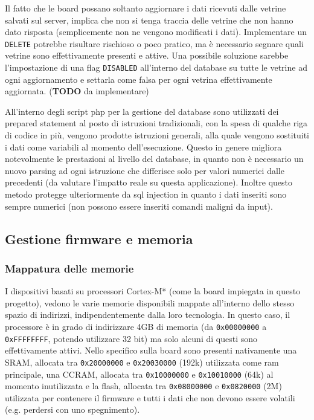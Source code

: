 Il fatto che le board possano soltanto aggiornare i dati ricevuti dalle vetrine salvati sul server, implica che non si tenga traccia delle vetrine che non hanno dato risposta (semplicemente non ne vengono modificati i dati). Implementare un \texttt{DELETE} potrebbe risultare rischioso o poco pratico, ma \`e necessario segnare quali vetrine sono effettivamente presenti e attive. Una possibile soluzione sarebbe l'impostazione di una flag \texttt{DISABLED} all'interno del database su tutte le vetrine ad ogni aggiornamento e settarla come falsa per ogni vetrina effettivamente aggiornata. (\textbf{TODO} da implementare)

All'interno degli script php per la gestione del database sono utilizzati dei prepared statement al posto di istruzioni tradizionali, con la spesa di qualche riga di codice in pi\`u, vengono prodotte istruzioni generali, alla quale vengono sostituiti i dati come variabili al momento dell'esecuzione. Questo in genere migliora notevolmente le prestazioni al livello del database, in quanto non \`e necessario un nuovo parsing ad ogni istruzione che differisce solo per valori numerici dalle precedenti (da valutare l'impatto reale su questa applicazione). Inoltre questo metodo protegge ulteriormente da sql injection in quanto i dati inseriti sono sempre numerici (non possono essere inseriti comandi maligni da input).

\subsection{Gestione firmware e memoria}

\subsubsection{Mappatura delle memorie}

I dispositivi basati su processori Cortex-M* (come la board impiegata in questo progetto), vedono le varie memorie disponibili mappate all'interno dello stesso spazio di indirizzi, indipendentemente dalla loro tecnologia. In questo caso, il processore \`e in grado di indirizzare 4GB di memoria (da \texttt{0x00000000} a \texttt{0xFFFFFFFF}, potendo utilizzare 32 bit) ma solo alcuni di questi sono effettivamente attivi. Nello specifico sulla board sono presenti nativamente una SRAM, allocata tra \texttt{0x20000000} e \texttt{0x20030000} (192k) utilizzata come ram principale, una CCRAM, allocata tra \texttt{0x10000000} e \texttt{0x10010000} (64k) al momento inutilizzata e la flash, allocata tra \texttt{0x08000000} e \texttt{0x0820000} (2M) utilizzata per contenere il firmware e tutti i dati che non devono essere volatili (e.g. perdersi con uno spegnimento).


